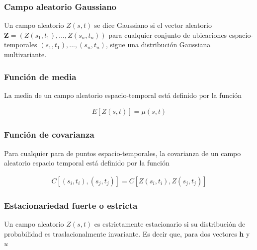 \documentclass[
]{book}
\begin{document}
\hypertarget{campo-aleatorio-gaussiano}{%
\subsubsection*{Campo aleatorio Gaussiano}\label{campo-aleatorio-gaussiano}}

Un campo aleatorio \(Z(s,t)\) se dice Gaussiano si el vector aleatorio \(\textbf{Z}=(Z(s_1,t_1),...,Z(s_n,t_n))\) para cualquier conjunto de ubicaciones espacio-temporales \({(s_1,t_1),...,(s_n,t_n)}\), sigue una distribución Gaussiana multivariante.

\hypertarget{funciuxf3n-de-media-1}{%
\subsubsection*{Función de media}\label{funciuxf3n-de-media-1}}

La media de un campo aleatorio espacio-temporal está definido por la función

\begin{align}
  E[Z(s,t)]=\mu(s,t)
  \end{align}

\hypertarget{funciuxf3n-de-covarianza-1}{%
\subsubsection*{Función de covarianza}\label{funciuxf3n-de-covarianza-1}}

Para cualquier para de puntos espacio-temporales, la covarianza de un campo aleatorio espacio temporal está definido por la función

\begin{align}
C[(s_i,t_i),(s_j,t_j)]=C[Z(s_i,t_i),Z(s_j,t_j)]
\end{align}

\hypertarget{estacionariedad-fuerte-o-estricta}{%
\subsubsection*{Estacionariedad fuerte o estricta}\label{estacionariedad-fuerte-o-estricta}}

Un campo aleatorio \(Z(s,t)\) es estrictamente estacionario si su distribución de probabilidad es traslacionalmente invariante. Es decir que, para dos vectores \(\textbf{h}\) y \(u\)
\end{document}
